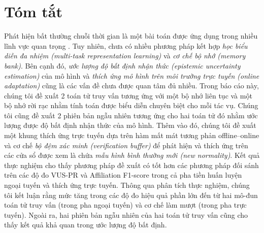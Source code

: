 \chapter*{Tóm tắt}
\label{summary}

Phát hiện bất thường chuỗi thời gian là một bài toán được ứng dụng trong nhiều lĩnh vực quan trọng \cite{10.1145/3637528.3671936} \cite{NEURIPS2023_7a53bf4e} \cite{10.1145/3746252.3760799}. Tuy nhiên, chưa có nhiều phương pháp kết hợp \textit{học biểu diễn đa nhiệm (multi-task representation learning)} và \textit{cơ chế bộ nhớ (memory bank)}. Bên cạnh đó, \textit{ước lượng độ bất định nhận thức (epistemic uncertainty estimation)} của mô hình và \textit{thích ứng mô hình trên môi trường trực tuyến (online adaptation)} cũng là các vấn đề chưa được quan tâm đủ nhiều. Trong báo cáo này, chúng tôi đề xuất 2 toán tử truy vấn tương ứng với một bộ nhớ liên tục và một bộ nhớ rời rạc nhằm tính toán được biểu diễn chuyên biệt cho mỗi tác vụ. Chúng tôi cũng đề xuất 2 phiên bản ngẫu nhiên tương ứng cho hai toán tử đó nhằm ước lượng được độ bất định nhận thức của mô hình. Thêm vào đó, chúng tôi đề xuất một khung thích ứng trực tuyến dựa trên hàm mất mát tương phản offline--online và cơ chế \textit{bộ đệm xác minh (verification buffer)} để phát hiện và thích ứng trên các cửa sổ được xem là chứa \textit{mẫu hình bình thường mới (new normality)}. Kết quả thực nghiệm cho thấy phương pháp đề xuất có tốt hơn các phương pháp đối sánh trên các độ đo VUS-PR và Affiliation F1-score trong cả pha tiền huấn luyện ngoại tuyến và thích ứng trực tuyến. Thông qua phân tích thực nghiệm, chúng tôi kết luận rằng mức tăng trong các độ đo hiệu quả phần lớn đến từ hai mô-đun toán tử truy vấn (trong pha ngoại tuyến) và cơ chế làm mượt (trong pha trực tuyến). Ngoài ra, hai phiên bản ngẫu nhiên của hai toán tử truy vấn cũng cho thấy kết quả khả quan trong ước lượng độ bất định.